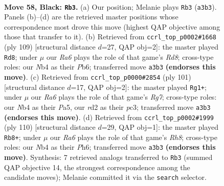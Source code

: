 \documentclass[11pt]{article}
\begin{document}
\clearpage

\begin{figure}[p]\centering
\begin{subfigure}{0.46\textwidth}\centering
\resizebox{\linewidth}{!}{%
\newchessgame
\chessboard[
  setfen={1k6/1p5p/6pP/p4p2/1n3P2/r7/3R3K/4R3 b - - 4 58},
  showmover=false,
  pgfstyle=straightmove, color=movearrow, markmove={a3-b3}
]}
\caption{}
\end{subfigure}\hfill
\begin{subfigure}{0.46\textwidth}\centering
\resizebox{\linewidth}{!}{%
\newchessgame
\chessboard[
  setfen={8/5p2/Pp4p1/2k1p1P1/4P3/2K5/R7/3r4 b - - 0 55},
  showmover=false,
  pgfstyle=straightmove, color=movearrow, markmove={d1-d8}
]}
\caption{}
\end{subfigure}
\\[4pt]
\begin{subfigure}{0.46\textwidth}\centering
\resizebox{\linewidth}{!}{%
\newchessgame
\chessboard[
  setfen={8/7R/1P1kp1p1/p4p2/P7/2P5/6r1/1K6 b - - 6 51},
  showmover=false,
  pgfstyle=straightmove, color=movearrow, markmove={g2-g1}
]}
\caption{}
\end{subfigure}\hfill
\begin{subfigure}{0.46\textwidth}\centering
\resizebox{\linewidth}{!}{%
\newchessgame
\chessboard[
  setfen={7R/2r5/7P/1k1p1pp1/p2P4/4P1K1/5P2/8 w - - 1 56},
  showmover=false,
  pgfstyle=straightmove, color=movearrow, markmove={h8-b8}
]}
\caption{}
\end{subfigure}
\caption{\textbf{Move 58, Black: \texttt{Rb3}.} (a) Our position; Melanie plays \texttt{Rb3} (\texttt{a3b3}). Panels (b)--(d) are the retrieved master positions whose correspondence most drove this move (highest QAP objective among those that transfer to it). (b) Retrieved from \texttt{ccrl\_top\_p0002\#1668} (ply 109) [structural distance $d$=27, QAP obj=2]: the master played \texttt{Rd8}; under $\mu$ our \emph{Ra6} plays the role of that game's \emph{Rd8}; cross-type roles: our \emph{N}b4 as their \emph{P}b6; transferred move \texttt{a3b3} \textbf{(endorses this move)}. (c) Retrieved from \texttt{ccrl\_top\_p0000\#2854} (ply 101) [structural distance $d$=17, QAP obj=2]: the master played \texttt{Rg1+}; under $\mu$ our \emph{Ra6} plays the role of that game's \emph{Rg7}; cross-type roles: our \emph{N}b4 as their \emph{P}a5, our \emph{r}d2 as their \emph{p}c3; transferred move \texttt{a3b3} \textbf{(endorses this move)}. (d) Retrieved from \texttt{ccrl\_top\_p0002\#1999} (ply 110) [structural distance $d$=29, QAP obj=1]: the master played \texttt{Rb8+}; under $\mu$ our \emph{Ra6} plays the role of that game's \emph{Rh8}; cross-type roles: our \emph{N}b4 as their \emph{P}h6; transferred move \texttt{a3b3} \textbf{(endorses this move)}. Synthesis: 7 retrieved analogs transferred to \texttt{Rb3} (summed QAP objective 14, the strongest correspondence among the candidate moves); Melanie committed it via the \texttt{search} selector.}
\label{fig:thought-m115}
\end{figure}
\end{document}
